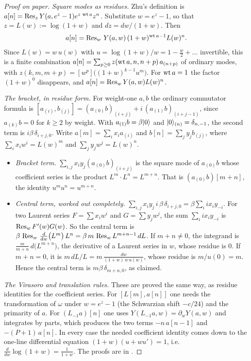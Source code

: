 \begin{proof}[Proof on paper]
\emph{Square modes as residues.} Zhu's definition is $a[n]=\operatorname{Res}_z Y(a,e^z-1)e^{z\,\operatorname{wt} a}z^{n}$. Substitute
$w=e^z-1$, so that $z=L(w):=\log(1+w)$ and $dz=dw/(1+w)$. Then
\begin{equation*}
a[n]=\operatorname{Res}_w\,Y(a,w)\,(1+w)^{\operatorname{wt} a-1}L(w)^n .
\end{equation*}
Since $L(w)=w\,u(w)$ with $u=\log(1+w)/w=1-\frac w2+\dots$ invertible, this is a finite combination
$a[n]=\sum_{p\ge0}z(\operatorname{wt} a,n,n+p)\,a_{(n+p)}$ of ordinary modes, with $z(k,m,m+p)=[w^p]\big((1+w)^{k-1}u^m\big)$. For
$\operatorname{wt} a=1$ the factor $(1+w)^0$ disappears, and $a[n]=\operatorname{Res}_wY(a,w)L(w)^n$.

\emph{The bracket, in residue form.} For weight-one $a,b$ the ordinary commutator formula is
$[a_{(i)},b_{(j)}]=(a_{(0)}b)_{(i+j)}+i\,(a_{(1)}b)_{(i+j-1)}$, since $a_{(k)}b=0$ for $k\ge2$ by weight. With
$a_{(1)}b=\beta|0\rangle$ and $|0\rangle_{(n)}=\delta_{n,-1}$, the second term is $i\beta\,\delta_{i+j,0}$.
Write $a[m]=\sum_ix_ia_{(i)}$ and $b[n]=\sum_jy_jb_{(j)}$, where $\sum_ix_iw^i=L(w)^m$ and $\sum_jy_jw^j=L(w)^n$.
\begin{itemize}
\item \emph{Bracket term.} $\sum_{i,j}x_iy_j(a_{(0)}b)_{(i+j)}$ is the square mode of $a_{(0)}b$ whose
  coefficient series is the product $L^m\cdot L^n=L^{m+n}$. That is $(a_{(0)}b)[m+n]$, the identity
  $u^mu^n=u^{m+n}$.
\item \emph{Central term, worked out completely.} $\sum_{i,j}x_iy_j\,i\,\beta\,\delta_{i+j,0}=\beta\sum_iix_iy_{-i}$.
  For two Laurent series $F=\sum x_iw^i$ and $G=\sum y_jw^j$, the sum $\sum_i i x_iy_{-i}$ is $\operatorname{Res}_w F'(w)G(w)$. So the
  central term is $\beta\,\operatorname{Res}_w\,\frac{d}{dw}\big(L^m\big)\,L^n=\beta\,m\,\operatorname{Res}_w L^{m+n-1}\,dL$. If $m+n\ne0$, the
  integrand is $\frac{m}{m+n}\,d\big(L^{m+n}\big)$, the derivative of a Laurent series in $w$, whose residue is $0$. If
  $m+n=0$, it is $m\,dL/L=m\,\frac{dw}{(1+w)\,w\,u(w)}$, whose residue is $m/u(0)=m$. Hence the central term is
  $m\beta\,\delta_{m+n,0}$, as claimed.
\end{itemize}
\emph{The Virasoro and translation rules.} These are proved the same way, as residue identities for the coefficient
series. For $[L[m],a[n]]$ one needs the transformation of $\omega$ under $w=e^z-1$ (the Schwarzian shift
$-c/24$) and the primarity of $a$. For $(L_{-1}a)[n]$ one uses $Y(L_{-1}a,w)=\partial_wY(a,w)$ and integrates by parts,
which produces the two terms $-n\,a[n-1]$ and $-(P+1)\,a[n]$. In every case the needed coefficient identity comes down
to the one-line differential equation $(1+w)(u+wu')=1$, i.e.\ $\frac{d}{dw}\log(1+w)=\frac1{1+w}$. The proofs are in
.
\end{proof}
